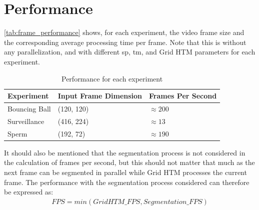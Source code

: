 \section{Performance}
\autoref{tab:frame_performance} shows, for each experiment, the video frame size and the corresponding average processing time per frame. Note that this is without any parallelization, and with different \gls*{sp}, \gls*{tm}, and Grid HTM parameters for each experiment.
\begin{table}[H]
    \centering
    \begin{tabularx}{\linewidth}{@{}XlX@{}}
        \toprule
        \textbf{Experiment} & \textbf{Input Frame Dimension} & \textbf{Frames Per Second} \\
        \midrule
        Bouncing Ball       & (120, 120)                     & $\approx 200$              \\
        Surveillance        & (416, 224)                     & $\approx 13$               \\
        Sperm               & (192, 72)                      & $\approx 190$              \\
        \bottomrule
    \end{tabularx}
    \caption{Performance for each experiment}
    \label{tab:frame_performance}
\end{table}
It should also be mentioned that the segmentation process is not considered in the calculation of frames per second, but this should not matter that much as the next frame can be segmented in parallel while Grid HTM processes the current frame. The performance with the segmentation process considered can therefore be expressed as:
\begin{align*}
    FPS=min(GridHTM\_FPS, Segmentation\_FPS)
\end{align*}
